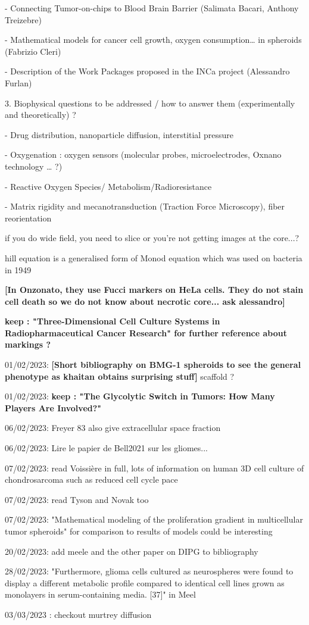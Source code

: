 \documentclass[11pt,a4paper]{article}
\begin{document}
-        Connecting Tumor-on-chips to Blood Brain Barrier (Salimata Bacari, Anthony Treizebre)

-        Mathematical models for cancer cell growth, oxygen consumption… in spheroids (Fabrizio Cleri) 

-        Description of the Work Packages proposed in the INCa project (Alessandro Furlan)

3.      Biophysical questions to be addressed / how to answer them (experimentally and theoretically) ?

-        Drug distribution, nanoparticle diffusion, interstitial pressure

-        Oxygenation : oxygen sensors (molecular probes, microelectrodes, Oxnano technology … ?)

-        Reactive Oxygen Species/ Metabolism/Radioresistance

-        Matrix rigidity and mecanotransduction (Traction Force Microscopy), fiber reorientation

if you do wide field, you need to slice or you're not getting images at the core...?

hill equation is a  generalised form of Monod equation which was used on bacteria in 1949

\textbf{[In Onzonato, they use Fucci markers on HeLa cells. They do not stain cell death so we do not know about necrotic core... ask alessandro]}

\textbf{keep : "Three-Dimensional Cell Culture Systems in Radiopharmaceutical Cancer Research" for further reference about markings ?}

01/02/2023: \textbf{[Short bibliography on  BMG-1 spheroids to see the general phenotype  as khaitan obtains surprising stuff]} scaffold ?

01/02/2023: \textbf{keep : "The Glycolytic Switch in Tumors: How Many Players Are Involved?"}

06/02/2023: Freyer 83 also give extracellular space fraction

06/02/2023: Lire le papier de Bell2021 sur les gliomes...

07/02/2023: read Voissière in full, lots of information on human 3D cell culture of chondrosarcoma such as reduced cell cycle pace

07/02/2023: read Tyson and Novak too

07/02/2023: "Mathematical modeling of the proliferation gradient in multicellular tumor spheroids" for comparison to results of models could be interesting

20/02/2023:  add meele and the other paper on DIPG to bibliography

28/02/2023: "Furthermore, glioma cells cultured as neurospheres were found to display a different metabolic profile compared to identical cell lines grown as monolayers in serum-containing
media. [37]" in Meel

03/03/2023 : checkout murtrey diffusion 


\newpage


\end{document}

